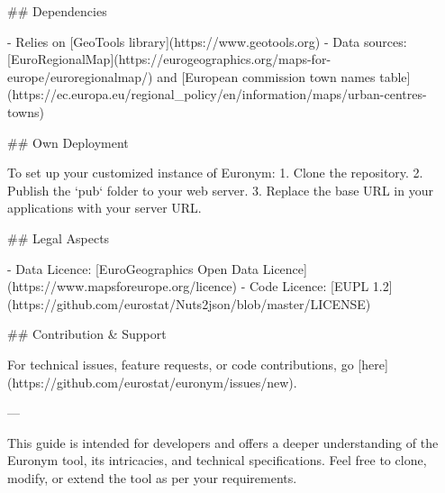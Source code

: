 ## Dependencies

- Relies on [GeoTools library](https://www.geotools.org)
- Data sources: [EuroRegionalMap](https://eurogeographics.org/maps-for-europe/euroregionalmap/) and [European commission town names table](https://ec.europa.eu/regional_policy/en/information/maps/urban-centres-towns)

## Own Deployment

To set up your customized instance of Euronym:
1. Clone the repository.
2. Publish the `pub` folder to your web server.
3. Replace the base URL in your applications with your server URL.

## Legal Aspects

- Data Licence: [EuroGeographics Open Data Licence](https://www.mapsforeurope.org/licence)
- Code Licence: [EUPL 1.2](https://github.com/eurostat/Nuts2json/blob/master/LICENSE)

## Contribution & Support

For technical issues, feature requests, or code contributions, go [here](https://github.com/eurostat/euronym/issues/new).

---

This guide is intended for developers and offers a deeper understanding of the Euronym tool, its intricacies, and technical specifications. Feel free to clone, modify, or extend the tool as per your requirements.